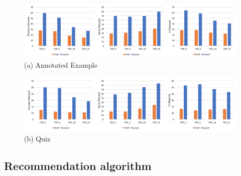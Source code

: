 \documentclass{sig-alternate}
\begin{document}
\begin{figure}[!t]
\centering
\begin{minipage}{\textwidth}
  \centering
  \includegraphics[width = \linewidth]{obr5.png}
  (a) Annotated Example
\end{minipage}%

\begin{minipage}{\textwidth}
  \centering
  \includegraphics[width=\linewidth]{obr6.png}
  (b) Quiz
\end{minipage}
\label{fig:fig4}
\end{figure}
\subsection{Recommendation algorithm}
\end{document}
